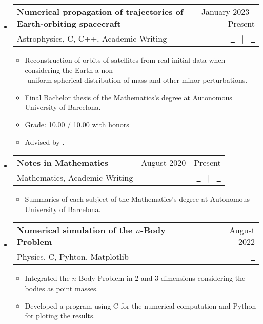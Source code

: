 \documentclass[a4paper,11pt]{article}
\makeatletter
\newcommand{\resumeItemListEnd}{\end{itemize}}
\newcommand{\resumeQuadHeading}[4]{
  \item
  \begin{tabular*}{0.96\textwidth}[t]{l@{\extracolsep{\fill}}r}
    \textbf{#1} & \small #2 \\
    \small#3 & \small #4 \\
  \end{tabular*}
}
\newcommand{\resumeHeadingListStart}{
  \begin{itemize}[leftmargin=0.15in, label={}]
}
\newcommand{\resumeHeadingListEnd}{\end{itemize}}
\makeatother
\begin{document}
\resumeHeadingListStart{}
\resumeQuadHeading{Numerical propagation of trajectories of Earth-orbiting spacecraft}{January 2023 - Present}{Astrophysics, C, C++, Academic Writing}{\href{https://github.com/victorballester7/final-bachelor-thesis/releases/latest/download/main.pdf}{\faFileTextO \ \graydotuline{Report}} \ $|$ \ \href{https://github.com/victorballester7/final-bachelor-thesis}{\faGithub \ \graydotuline{Code}}}
\begin{itemize}[leftmargin=3em, itemsep=0.1em, topsep=2pt]
  \item \small Reconstruction of orbits of satellites from real initial data when considering the Earth a non-\\-uniform spherical distribution of mass and other minor perturbations.
  \item \small Final Bachelor thesis of the Mathematics's degree at Autonomous University of Barcelona.
  \item Grade: 10.00 / 10.00 with honors
  \item \small Advised by \href{http://www.gsd.uab.es/people?controller=member&view=member&id=9&slug=josep-maria}{}.
\end{itemize}
\resumeHeadingListEnd{}

\resumeHeadingListStart{}
\resumeQuadHeading{Notes in Mathematics}{August 2020 - Present}{Mathematics, Academic Writing}{\href{https://victorballester7.github.io/complete-summaries/}{\faGlobe \ \graydotuline{Website}} \ $|$ \ \href{https://github.com/victorballester7/complete-summaries}{\faGithub \ \graydotuline{Code}}}
\begin{itemize}[leftmargin=3em, itemsep=0.1em, topsep=2pt]
  \item \small Summaries of each subject of the Mathematics's degree at Autonomous University of Barcelona.
\end{itemize}
\resumeItemListEnd{}

\resumeHeadingListStart{}
\resumeQuadHeading{Numerical simulation of the $n$-Body Problem}{August 2022}{Physics, C, Pyhton, Matplotlib}{\href{https://github.com/victorballester7/n-body_problem}{\faGithub \ \graydotuline{Code}}}
\begin{itemize}[leftmargin=3em, itemsep=0.1em, topsep=2pt]
  \item \small Integrated the $n$-Body Problem in 2 and 3 dimensions considering the bodies as point masses.
  \item \small Developed a program using C for the numerical computation and Python for ploting the results.
\end{itemize}
\resumeHeadingListEnd{}
\end{document}
